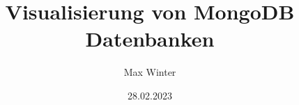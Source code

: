 \documentclass[oneside]{ausarbeitung}
\begin{document}


\Projektbericht

\Informatik

\title{Visualisierung von MongoDB Datenbanken}

\author{Max Winter}

\examinerIsAProfessortrue   %


\date{28.02.2023}



\maketitle
\cleardoublepage

\setcounter{page}{1}





\cleardoublepage
\tableofcontents

\listoffigures

\listoftables
\end{document}

